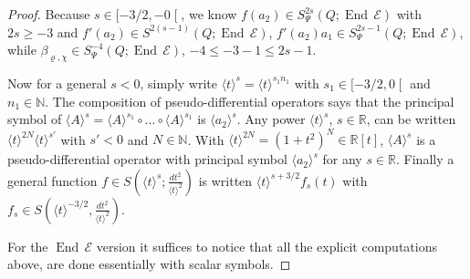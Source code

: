 \documentclass[10pt]{amsart}
\theoremstyle{definition}\newtheorem{defi}[theo]{Definition}\newtheorem{rema}[theo]{Remark}\newtheorem{exam}[theo]{Example}\newtheorem{exem}[theo]{Example}\newtheorem{nota}[theo]{Notation}
\newcommand{\R}{\mathbb{R}}
\newcommand{\N}{\mathbb{N}}
\newcommand{\clE}{\mathcal{E}}
\DeclareMathOperator{\End}{End}
\begin{document}
\begin{proof}
Because $s\in [-3/2,-0\mathclose{[}$, we know $f(a_{2})\in S^{2s}_{\Psi}(Q;\End\,\clE)$ with $2s\geq -3$ and $f'(a_{2})\in S^{2(s-1)}(Q;\End\,\clE)$, $f'(a_{2})a_{1}\in S^{2s-1}_{\Psi}(Q;\End\,\clE)$, while $\beta_{\varrho,\chi}\in S^{-4}_{\Psi}(Q;\End\,\clE)$, $-4\leq -3-1\leq 2s-1$.

Now for a general $s<0$, simply write $\langle t\rangle^{s}=\langle t\rangle^{s_{1}n_{1}}$ with $s_{1}\in [-3/2,0\mathclose{[}$ and $n_{1}\in \N$. The composition of pseudo-differential operators says that the principal symbol of $\langle A\rangle^{s}=\langle A\rangle^{s_{1}}\circ\dots\circ \langle A\rangle^{s_{1}}$ is $\langle a_{2}\rangle^{s}$. Any power $\langle t\rangle^{s}$, $s\in \R$, can be written $\langle t\rangle^{2N}\langle t\rangle^{s'}$ with $s'<0$ and $N\in \N$. With $\langle t\rangle^{2N}=(1+t^{2})^{N}\in \R[t]$, $\langle A\rangle^{s}$ is a pseudo-differential operator with principal symbol $\langle a_{2}\rangle^{s}$ for any $s\in \R$. Finally a general function $f\in S(\langle t\rangle^{s};\frac{dt^{2}}{\langle t\rangle^{2}})$ is written $\langle t\rangle^{s+3/2}f_{s}(t)$ with $f_{s}\in S(\langle t\rangle^{-3/2},\frac{dt^{2}}{\langle t\rangle^{2}})$.

For the $\End\,\clE$ version it suffices to notice that all the explicit computations above, are done essentially with scalar symbols.
\end{proof}
\end{document}
